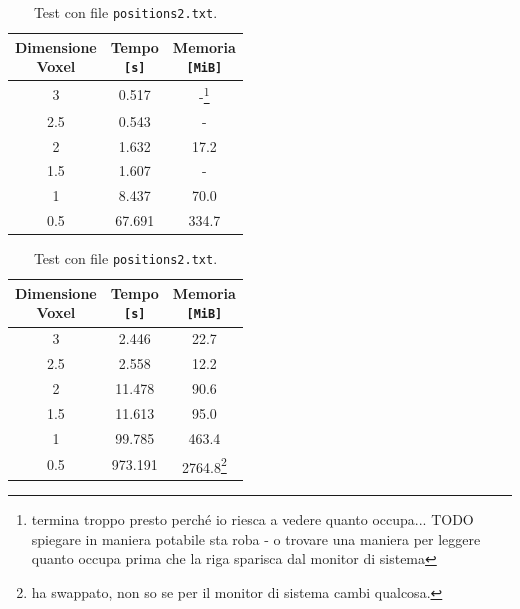 \begin{center}
  \begin{table}[h]
    \begin{minipage}{.5\linewidth}
      \vspace{0pt}
      \begin{tabular}{ccc}
        \toprule
          \shortstack{Dimensione\\ Voxel} & \shortstack{Tempo \\\texttt{[s]}} & \shortstack{Memoria \\\texttt{[MiB]}}\\
        \midrule
          3   & 0.517  & -\footnote{termina troppo presto perché io riesca a vedere quanto occupa... TODO spiegare in maniera potabile sta roba - o trovare una maniera per leggere quanto occupa prima che la riga sparisca dal monitor di sistema}     \\
          2.5 & 0.543  & -     \\
          2   & 1.632  & 17.2  \\
          1.5 & 1.607  & -     \\
          1   & 8.437  & 70.0  \\
          0.5 & 67.691 & 334.7 \\
        \bottomrule
      \end{tabular}
      \caption{Test con file \texttt{positions.txt}.}
      \label{tab:positionsnone}
    \end{minipage}
    \begin{minipage}{.5\linewidth}
      \vspace{0pt}\raggedright
      \begin{tabular}{ccc}
        \toprule
          \shortstack{Dimensione\\ Voxel} & \shortstack{Tempo \\\texttt{[s]}} & \shortstack{Memoria \\\texttt{[MiB]}}\\
        \midrule
          3   & 2.446   & 22.7   \\
          2.5 & 2.558   & 12.2   \\
          2   & 11.478  & 90.6   \\
          1.5 & 11.613  & 95.0   \\
          1   & 99.785  & 463.4  \\
          0.5 & 973.191 & 2764.8\footnote{ha swappato, non so se per il monitor di sistema cambi qualcosa.} \\
        \bottomrule
      \end{tabular}
      \caption{Test con file \texttt{positions2.txt}.}
      \label{tab:positions2none}
    \end{minipage}
  \end{table}
\end{center}

